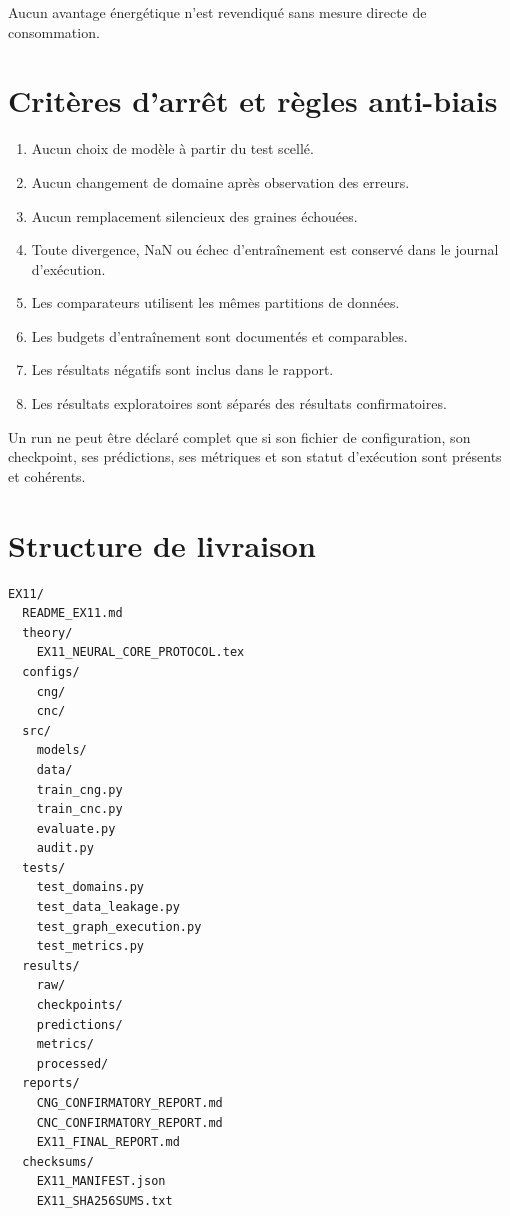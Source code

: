 \documentclass[11pt,a4paper]{article}
\begin{document}
Aucun avantage énergétique n'est revendiqué sans mesure directe
de consommation.

\section{Critères d'arrêt et règles anti-biais}

\begin{enumerate}
  \item Aucun choix de modèle à partir du test scellé.
  \item Aucun changement de domaine après observation des erreurs.
  \item Aucun remplacement silencieux des graines échouées.
  \item Toute divergence, NaN ou échec d'entraînement est conservé
        dans le journal d'exécution.
  \item Les comparateurs utilisent les mêmes partitions de données.
  \item Les budgets d'entraînement sont documentés et comparables.
  \item Les résultats négatifs sont inclus dans le rapport.
  \item Les résultats exploratoires sont séparés des résultats
        confirmatoires.
\end{enumerate}

Un run ne peut être déclaré complet que si son fichier de configuration,
son checkpoint, ses prédictions, ses métriques et son statut d'exécution
sont présents et cohérents.

\section{Structure de livraison}

\begin{verbatim}
EX11/
  README_EX11.md
  theory/
    EX11_NEURAL_CORE_PROTOCOL.tex
  configs/
    cng/
    cnc/
  src/
    models/
    data/
    train_cng.py
    train_cnc.py
    evaluate.py
    audit.py
  tests/
    test_domains.py
    test_data_leakage.py
    test_graph_execution.py
    test_metrics.py
  results/
    raw/
    checkpoints/
    predictions/
    metrics/
    processed/
  reports/
    CNG_CONFIRMATORY_REPORT.md
    CNC_CONFIRMATORY_REPORT.md
    EX11_FINAL_REPORT.md
  checksums/
    EX11_MANIFEST.json
    EX11_SHA256SUMS.txt
\end{verbatim}
\end{document}
